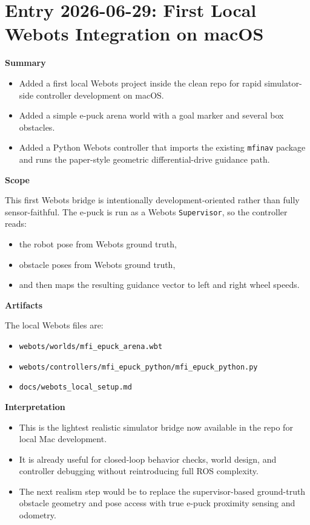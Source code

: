 \documentclass[11pt]{article}
\begin{document}
\section*{Entry 2026-06-29: First Local Webots Integration on macOS}

\textbf{Summary}

\begin{itemize}[leftmargin=*]
  \item Added a first local Webots project inside the clean repo for rapid simulator-side controller development on macOS.
  \item Added a simple e-puck arena world with a goal marker and several box obstacles.
  \item Added a Python Webots controller that imports the existing \texttt{mfinav} package and runs the paper-style geometric differential-drive guidance path.
\end{itemize}

\textbf{Scope}

This first Webots bridge is intentionally development-oriented rather than fully
sensor-faithful. The e-puck is run as a Webots \texttt{Supervisor}, so the
controller reads:
\begin{itemize}[leftmargin=*]
  \item the robot pose from Webots ground truth,
  \item obstacle poses from Webots ground truth,
  \item and then maps the resulting guidance vector to left and right wheel speeds.
\end{itemize}

\textbf{Artifacts}

The local Webots files are:
\begin{itemize}[leftmargin=*]
  \item \texttt{webots/worlds/mfi\_epuck\_arena.wbt}
  \item \texttt{webots/controllers/mfi\_epuck\_python/mfi\_epuck\_python.py}
  \item \texttt{docs/webots\_local\_setup.md}
\end{itemize}

\textbf{Interpretation}

\begin{itemize}[leftmargin=*]
  \item This is the lightest realistic simulator bridge now available in the repo for local Mac development.
  \item It is already useful for closed-loop behavior checks, world design, and controller debugging without reintroducing full ROS complexity.
  \item The next realism step would be to replace the supervisor-based ground-truth obstacle geometry and pose access with true e-puck proximity sensing and odometry.
\end{itemize}
\end{document}

